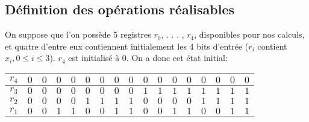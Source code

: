 \documentclass{article}
\begin{document}
\subsection{Définition des opérations réalisables}

On suppose que l'on possède 5 registres $r_{0}$, . . . , $r_{4}$, disponibles pour nos calculs, et quatre d'entre eux contiennent initialement les 4 bits d'entrée ($r_{i}$ contient $x_{i}, 0\leq i\leq 3$). $r_{4}$ est initialisé à 0. On a donc cet état initial:

\medbreak
\begin{center}
\begin{tabular}{|l|l|l|l|l|l|l|l|l|l|l|l|l|l|l|l|l|}
\hline
\multicolumn{1}{|l|}{$r_{4}$}&	\multicolumn{1}{|l|}{$0$}&	\multicolumn{1}{|l|}{$0$}&	\multicolumn{1}{|l|}{$0$}&	\multicolumn{1}{|l|}{$0$}&	\multicolumn{1}{|l|}{$0$}&	\multicolumn{1}{|l|}{$0$}&	\multicolumn{1}{|l|}{$0$}&	\multicolumn{1}{|l|}{$0$}&	\multicolumn{1}{|l|}{$0$}&	\multicolumn{1}{|l|}{$0$}&	\multicolumn{1}{|l|}{$0$}&	\multicolumn{1}{|l|}{$0$}&	\multicolumn{1}{|l|}{$0$}&	\multicolumn{1}{|l|}{$0$}&	\multicolumn{1}{|l|}{$0$}&	\multicolumn{1}{|l|}{$0$}	\\
\hline
\multicolumn{1}{|l|}{$r_{3}$}&	\multicolumn{1}{|l|}{$0$}&	\multicolumn{1}{|l|}{ $0$}&	\multicolumn{1}{|l|}{ $0$}&	\multicolumn{1}{|l|}{ $0$}&	\multicolumn{1}{|l|}{ $0$}&	\multicolumn{1}{|l|}{ $0$}&	\multicolumn{1}{|l|}{ $0$}&	\multicolumn{1}{|l|}{ $0$}&	\multicolumn{1}{|l|}{ $1$}&	\multicolumn{1}{|l|}{ $1$}&	\multicolumn{1}{|l|}{ $1$}&	\multicolumn{1}{|l|}{ $1$}&	\multicolumn{1}{|l|}{ $1$}&	\multicolumn{1}{|l|}{ $1$}&	\multicolumn{1}{|l|}{ $1$}&	\multicolumn{1}{|l|}{ $1$}	\\
\hline
\multicolumn{1}{|l|}{ $r_{2}$}&	\multicolumn{1}{|l|}{ $0$}&	\multicolumn{1}{|l|}{ $0$}&	\multicolumn{1}{|l|}{ $0$}&	\multicolumn{1}{|l|}{ $0$}&	\multicolumn{1}{|l|}{ $1$}&	\multicolumn{1}{|l|}{ $1$}&	\multicolumn{1}{|l|}{ $1$}&	\multicolumn{1}{|l|}{ $1$}&	\multicolumn{1}{|l|}{ $0$}&	\multicolumn{1}{|l|}{ $0$}&	\multicolumn{1}{|l|}{ $0$}&	\multicolumn{1}{|l|}{ $0$}&	\multicolumn{1}{|l|}{ $1$}&	\multicolumn{1}{|l|}{ $1$}&	\multicolumn{1}{|l|}{ $1$}&	\multicolumn{1}{|l|}{ $1$}	\\
\hline
\multicolumn{1}{|l|}{ $r_{1}$}&	\multicolumn{1}{|l|}{ $0$}&	\multicolumn{1}{|l|}{ $0$}&	\multicolumn{1}{|l|}{ $1$}&	\multicolumn{1}{|l|}{ $1$}&	\multicolumn{1}{|l|}{ $0$}&	\multicolumn{1}{|l|}{ $0$}&	\multicolumn{1}{|l|}{ $1$}&	\multicolumn{1}{|l|}{ $1$}&	\multicolumn{1}{|l|}{ $0$}&	\multicolumn{1}{|l|}{ $0$}&	\multicolumn{1}{|l|}{ $1$}&	\multicolumn{1}{|l|}{ $1$}&	\multicolumn{1}{|l|}{ $0$}&	\multicolumn{1}{|l|}{ $0$}&	\multicolumn{1}{|l|}{ $1$}&	\multicolumn{1}{|l|}{ $1$}	\\

\end{tabular}
\end{center}
\end{document}
